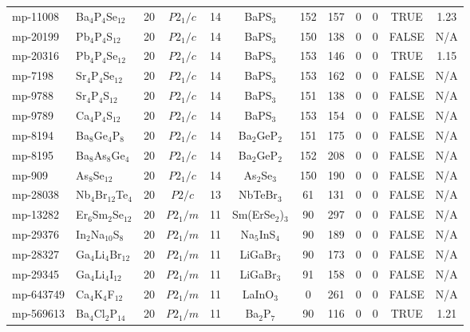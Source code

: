 {\begin{longtable}{llcccccccccc}
    mp-11008 & Ba$_{4}$P$_{4}$Se$_{12}$ & 20    & $P2_1/c$ & 14    & BaPS$_{3}$ & 152   & 157   & 0     & 0     & TRUE  & 1.23  \\
    mp-20199 & Pb$_{4}$P$_{4}$S$_{12}$ & 20    & $P2_1/c$ & 14    & BaPS$_{3}$ & 150   & 138   & 0     & 0     & FALSE & N/A \\
    mp-20316 & Pb$_{4}$P$_{4}$Se$_{12}$ & 20    & $P2_1/c$ & 14    & BaPS$_{3}$ & 153   & 146   & 0     & 0     & TRUE  & 1.15  \\
    mp-7198 & Sr$_{4}$P$_{4}$Se$_{12}$ & 20    & $P2_1/c$ & 14    & BaPS$_{3}$ & 153   & 162   & 0     & 0     & FALSE & N/A \\
    mp-9788 & Sr$_{4}$P$_{4}$S$_{12}$ & 20    & $P2_1/c$ & 14    & BaPS$_{3}$ & 151   & 138   & 0     & 0     & FALSE & N/A \\
    mp-9789 & Ca$_{4}$P$_{4}$S$_{12}$ & 20    & $P2_1/c$ & 14    & BaPS$_{3}$ & 153   & 154   & 0     & 0     & FALSE & N/A \\
    mp-8194 & Ba$_{8}$Ge$_{4}$P$_{8}$ & 20    & $P2_1/c$ & 14    & Ba$_{2}$GeP$_{2}$ & 151   & 175   & 0     & 0     & FALSE & N/A \\
    mp-8195 & Ba$_{8}$As$_{8}$Ge$_{4}$ & 20    & $P2_1/c$ & 14    & Ba$_{2}$GeP$_{2}$ & 152   & 208   & 0     & 0     & FALSE & N/A \\
    mp-909 & As$_{8}$Se$_{12}$ & 20    & $P2_1/c$ & 14    & As$_{2}$Se$_{3}$ & 150   & 190   & 0     & 0     & FALSE & N/A \\
    mp-28038 & Nb$_{4}$Br$_{12}$Te$_{4}$ & 20    & $P2/c$ & 13    & NbTeBr$_{3}$ & 61    & 131   & 0     & 0     & FALSE & N/A \\
    mp-13282 & Er$_{6}$Sm$_{2}$Se$_{12}$ & 20    & $P2_1/m$ & 11    & Sm(ErSe$_{2}$)$_{3}$ & 90    & 297   & 0     & 0     & FALSE & N/A \\
    mp-29376 & In$_{2}$Na$_{10}$S$_{8}$ & 20    & $P2_1/m$ & 11    & Na$_{5}$InS$_{4}$ & 90    & 189   & 0     & 0     & FALSE & N/A \\
    mp-28327 & Ga$_{4}$Li$_{4}$Br$_{12}$ & 20    & $P2_1/m$ & 11    & LiGaBr$_{3}$ & 90    & 173   & 0     & 0     & FALSE & N/A \\
    mp-29345 & Ga$_{4}$Li$_{4}$I$_{12}$ & 20    & $P2_1/m$ & 11    & LiGaBr$_{3}$ & 91    & 158   & 0     & 0     & FALSE & N/A \\
    mp-643749 & Ca$_{4}$K$_{4}$F$_{12}$ & 20    & $P2_1/m$ & 11    & LaInO$_{3}$ & 0     & 261   & 0     & 0     & FALSE & N/A \\
    mp-569613 & Ba$_{4}$Cl$_{2}$P$_{14}$ & 20    & $P2_1/m$ & 11    & Ba$_{2}$P$_{7}$ & 90    & 116   & 0     & 0     & TRUE  & 1.21  \\

\end{longtable}}
